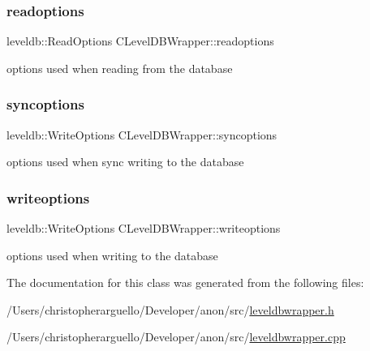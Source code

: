 \subsubsection{\texorpdfstring{readoptions}{readoptions}}
{\footnotesize\ttfamily leveldb\+::\+Read\+Options C\+Level\+D\+B\+Wrapper\+::readoptions\hspace{0.3cm}{\ttfamily [private]}}



options used when reading from the database 

\mbox{\label{class_c_level_d_b_wrapper_a0929ea3b9ae8cdd1fbdeba0caaba6869}} 
\subsubsection{\texorpdfstring{syncoptions}{syncoptions}}
{\footnotesize\ttfamily leveldb\+::\+Write\+Options C\+Level\+D\+B\+Wrapper\+::syncoptions\hspace{0.3cm}{\ttfamily [private]}}



options used when sync writing to the database 

\mbox{\label{class_c_level_d_b_wrapper_a2761173f9be7d16c7306f5a3565068ca}} 
\subsubsection{\texorpdfstring{writeoptions}{writeoptions}}
{\footnotesize\ttfamily leveldb\+::\+Write\+Options C\+Level\+D\+B\+Wrapper\+::writeoptions\hspace{0.3cm}{\ttfamily [private]}}



options used when writing to the database 



The documentation for this class was generated from the following files\+:\begin{DoxyCompactItemize}
\item 
/\+Users/christopherarguello/\+Developer/anon/src/\mbox{\hyperlink{leveldbwrapper_8h}{leveldbwrapper.\+h}}\item 
/\+Users/christopherarguello/\+Developer/anon/src/\mbox{\hyperlink{leveldbwrapper_8cpp}{leveldbwrapper.\+cpp}}\end{DoxyCompactItemize}
